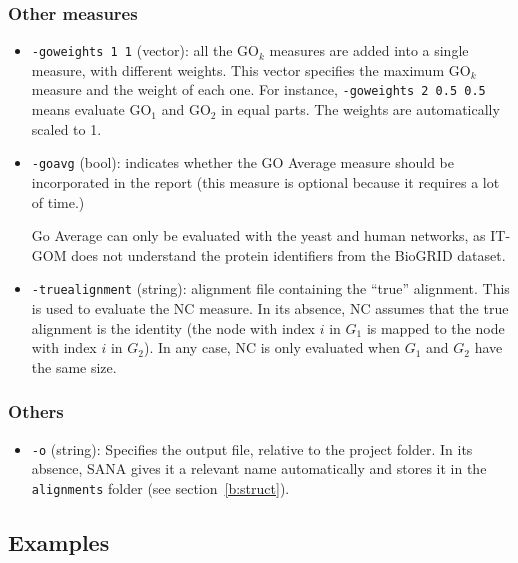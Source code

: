 \documentclass[]{article}
\begin{document}
\subsubsection*{Other measures}
\begin{itemize}
\item\texttt{-goweights 1 1} (vector): all the $\mbox{GO}_k$ measures are added into a single measure, with different weights. This vector specifies the maximum $\mbox{GO}_k$ measure and the weight of each one. For instance, \texttt{-goweights 2 0.5 0.5} means evaluate $\mbox{GO}_1$ and $\mbox{GO}_2$ in equal parts. The weights are automatically scaled to 1.
\item\texttt{-goavg} (bool): indicates whether the GO Average measure should be incorporated in the report (this measure is optional because it requires a lot of time.)

Go Average can only be evaluated with the yeast and human networks, as IT-GOM does not understand the protein identifiers from the BioGRID dataset.
\item\texttt{-truealignment} (string): alignment file containing the ``true'' alignment. This is used to evaluate the NC measure. In its absence, NC assumes that the true alignment is the identity (the node with index $i$ in $G_1$ is mapped to the node with index $i$ in $G_2$). In any case, NC is only evaluated when $G_1$ and $G_2$ have the same size.
\end{itemize}

\subsubsection*{Others}
\begin{itemize}
\item\texttt{-o} (string): Specifies the output file, relative to the project folder. In its absence, SANA gives it a relevant name automatically and stores it in the \texttt{alignments} folder (see section~\ref{b:struct}).
\end{itemize}

\subsection{Examples}
\end{document}
